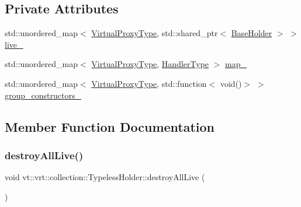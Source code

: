 \subsection*{Private Attributes}
\begin{DoxyCompactItemize}
\item 
std\+::unordered\+\_\+map$<$ \hyperlink{namespacevt_a1b417dd5d684f045bb58a0ede70045ac}{Virtual\+Proxy\+Type}, std\+::shared\+\_\+ptr$<$ \hyperlink{structvt_1_1vrt_1_1collection_1_1_base_holder}{Base\+Holder} $>$ $>$ \hyperlink{structvt_1_1vrt_1_1collection_1_1_typeless_holder_a517ed716d418dd5260e072fa2eb638df}{live\+\_\+}
\item 
std\+::unordered\+\_\+map$<$ \hyperlink{namespacevt_a1b417dd5d684f045bb58a0ede70045ac}{Virtual\+Proxy\+Type}, \hyperlink{namespacevt_af64846b57dfcaf104da3ef6967917573}{Handler\+Type} $>$ \hyperlink{structvt_1_1vrt_1_1collection_1_1_typeless_holder_a2b77bd58e627e46859fd85702f8cc4de}{map\+\_\+}
\item 
std\+::unordered\+\_\+map$<$ \hyperlink{namespacevt_a1b417dd5d684f045bb58a0ede70045ac}{Virtual\+Proxy\+Type}, std\+::function$<$ void()$>$ $>$ \hyperlink{structvt_1_1vrt_1_1collection_1_1_typeless_holder_af0e61d3465642c9ebf6b30e16ed843f0}{group\+\_\+constructors\+\_\+}
\end{DoxyCompactItemize}


\subsection{Member Function Documentation}
\mbox{\label{structvt_1_1vrt_1_1collection_1_1_typeless_holder_af968b98622d1d81888d8667a94e5950d}} 
\subsubsection{\texorpdfstring{destroy\+All\+Live()}{destroyAllLive()}}
{\footnotesize\ttfamily void vt\+::vrt\+::collection\+::\+Typeless\+Holder\+::destroy\+All\+Live (\begin{DoxyParamCaption}{ }\end{DoxyParamCaption})}

\mbox{\label{structvt_1_1vrt_1_1collection_1_1_typeless_holder_a79330546a2110fe7d7b6bdd2929db2de}} 

